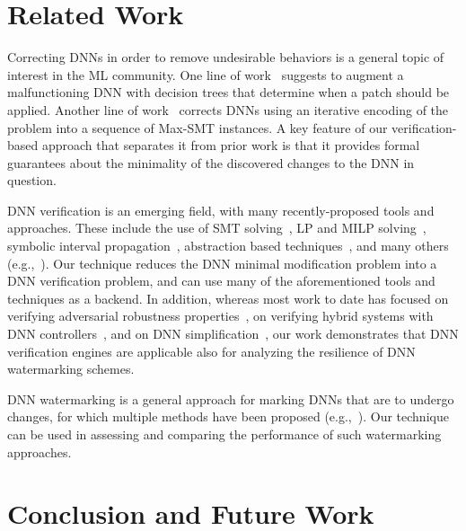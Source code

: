 \documentclass{easychair}
\begin{document}
\section{Related Work}
\label{sec:relatedWork}

Correcting DNNs in order to remove undesirable behaviors is a general
topic of interest in the ML community. One line of
work~\cite{KaLe18,KaFu18} suggests to augment a malfunctioning DNN
with decision trees that determine when a patch should be
applied. Another line of work~\cite{SoTh19} corrects DNNs using an
iterative encoding of the problem into a sequence of Max-SMT
instances. A key feature of our verification-based approach that
separates it from prior work is that it provides formal
guarantees about the minimality of the discovered changes to the DNN
in question.

DNN verification is an emerging field, with many recently-proposed
tools and approaches. These include the use of SMT
solving~\cite{HuKwWaWu17,JaBaKa20,KaBaDiJuKo17Reluplex,KaHuIbJuLaLiShThWuZeDiKoBa19Marabou},
LP and MILP solving~\cite{Ehlers2017,TjXiTe19}, symbolic interval
propagation~\cite{WaPeWhYaJa18}, abstraction based
techniques~\cite{ElGoKa20,GeMiDrTsChVe18}, and many others
(e.g.,~\cite{BuTuToKoMu18,DuJhSaTi18,KaBaKaSc19,KuKaGoJuBaKo18,LoMa17,NaKaRySaWa17,RuHuKw18,SiGePuVe19}).
Our technique reduces the DNN minimal modification problem into a DNN
verification problem, and can use many of the aforementioned tools and
techniques as a backend. In addition, whereas most work to date has
focused on verifying adversarial robustness
properties~\cite{BaIoLaVyNoCr16,CaKaBaDi17,GoKaPaBa18,KaBaDiJuKo17Fvav},
on verifying hybrid systems with DNN
controllers~\cite{DuChSa19,SuKhSh19}, and on DNN
simplification~\cite{GoFeMaBaKa20}, our work demonstrates that DNN
verification engines are applicable also for analyzing the resilience
of DNN watermarking schemes.

DNN watermarking is a general approach for marking DNNs that are to undergo
changes, for which multiple methods have been proposed 
(e.g.,~\cite{AdBaPiKeWatermarking,ChRoKo18,LePeTr19,UcNaSaSa17,VeUsTaOcGa11}).
Our technique can be used in assessing and comparing the
performance of such watermarking approaches.


\section{Conclusion and Future Work}
\label{sec:conclusion}
\end{document}
